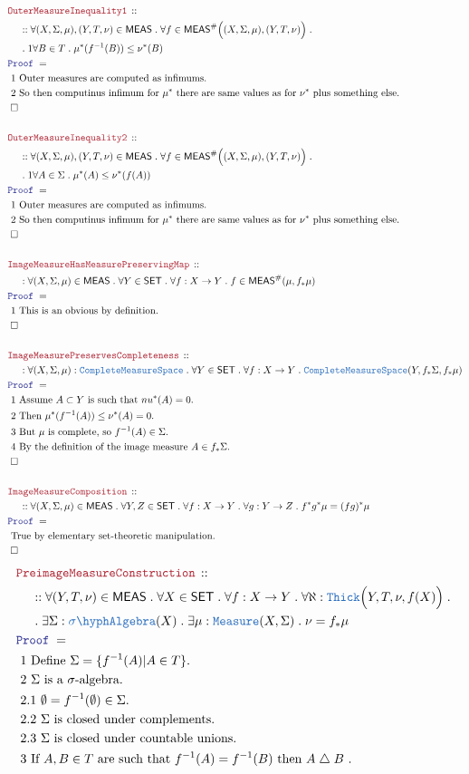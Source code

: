 \documentclass[12pt]{scrartcl}
\newcommand{\TYPE}[1]{\textcolor{NavyBlue}{\mathtt{#1}}}
\newcommand{\LOGIC}[1]{\textcolor{Blue}{\mathtt{#1}}}
\newcommand{\THM}[1]{\textcolor{Maroon}{\mathtt{#1}}}
\renewcommand{\.}{\; . \;}
\newcommand{\Theorem}[2]{& \THM{#1} \, :: \, #2 \\ & \Proof = \\ }
\newcommand{\NewLine}{\\ & \kern 1pc}
\newcommand{\Page}[1]{ \begin{align*} #1 \end{align*}   }
\newcommand{\du}{\; \triangle \;}
\newcommand{\QED}{\; \square}
\newcommand{\EndProof}{& \QED \\}
\newcommand{\Proof}{\LOGIC{Proof} \; }
\newcommand{\Explain}[1]{& \text{#1.} \\}
\newcommand{\SA}{\TYPE{\sigma \hyph Algebra}}
\newcommand{\SET}{\mathsf{SET}}
\newcommand{\Measure}{\TYPE{Measure}}
\newcommand{\CMS}{\TYPE{CompleteMeasureSpace}}
\newcommand{\MEAS}{\mathsf{MEAS}}
\begin{document}
{}\Page{
	\Theorem{OuterMeasureInequality1}
	{
		\NewLine ::		
		\forall (X,\Sigma,\mu),(Y,T,\nu) \in \MEAS \. 
		\forall f \in \MEAS^\#\Big((X,\Sigma,\mu),(Y,T,\nu)\Big) \. \NewLine \.1
		\forall B \in T \. 
		\mu^*(f^{-1}(B)) \le \nu^*(B) 
	}
	\Explain{ 1 Outer measures are computed as infimums}
	\Explain{ 2 So then computinus infimum for $\mu^*$ there are same
		values as for $\nu^*$ plus something else}
	\EndProof
	\\
	\Theorem{OuterMeasureInequality2}
	{
		\NewLine ::		
		\forall (X,\Sigma,\mu),(Y,T,\nu) \in \MEAS \. 
		\forall f \in \MEAS^\#\Big((X,\Sigma,\mu),(Y,T,\nu)\Big) \. \NewLine \.1
		\forall A \in \Sigma \. 
		\mu^*(A) \le \nu^*(f(A)) 
	}
	\Explain{ 1 Outer measures are computed as infimums}
	\Explain{ 2 So then computinus infimum for $\mu^*$ there are same
		values as for $\nu^*$ plus something else}
	\EndProof
	\\
	\Theorem{ImageMeasureHasMeasurePreservingMap}
	{
		\NewLine : 
		\forall (X,\Sigma,\mu) \in \MEAS \.
		\forall Y \in \SET \.
		\forall f : X \to Y \.
		f \in \MEAS^\#(\mu, f_* \mu)
	}
	\Explain{ 1 This is an obvious by definition}
	\EndProof
	\\
	\Theorem{ImageMeasurePreservesCompleteness}
	{
		\NewLine :
		\forall (X,\Sigma,\mu)  : \CMS \.
		\forall Y \in \SET \.
		\forall f : X \to Y \.
		\CMS(Y, f_*\Sigma, f_* \mu ) 
	}
	\Explain{ 1 Assume $A \subset Y$ is such that $nu^*(A) = 0$}
	\Explain{ 2 Then $\mu^*(f^{-1}(A)) \le \nu^*(A)  = 0$}
	\Explain{ 3 But $\mu$ is complete, so $f^{-1}(A) \in \Sigma$}
	\Explain{ 4 By the definition of the image measure $A \in f_* \Sigma$}
	\EndProof
	\\
	\Theorem{ImageMeasureComposition}
	{
		\NewLine ::		
		\forall (X,\Sigma,\mu) \in \MEAS \.
		\forall Y,Z \in \SET \.
		\forall f : X \to Y \.
		\forall g : Y \to Z \.
		f^* g^* \mu = (fg)^* \mu 
	}
	\Explain{ True by elementary set-theoretic manipulation}
	\EndProof
}\Page{
	\Theorem{PreimageMeasureConstruction}
	{
		\NewLine  ::
		\forall (Y,T,\nu) \in \MEAS \.
		\forall X \in \SET \.
		\forall f  : X \to Y \.
		\forall \aleph :   \TYPE{Thick}\Big(Y,T,\nu, f(X)\Big) \. \NewLine \.   
		\exists \Sigma : \SA(X) \.
		\exists \mu : \Measure(X,\Sigma) \.
		\nu = f_* \mu 
	}
	\Explain{ 1 Define $\Sigma = \{ f^{-1}(A) | A \in T  \}$} 
	\Explain{ 2 $\Sigma$ is a $\sigma$-algebra}
	\Explain{ 2.1  $\emptyset = f^{-1}(\emptyset) \in \Sigma$}
	\Explain{ 2.2 $\Sigma$ is closed under complements}
	\Explain{ 2.3 $\Sigma$ is closed under countable unions}
	\Explain{ 3 If $A,B \in T$ are such that $f^{-1}(A) = f^{-1}(B)$ then $A \du B$ 
}}
\end{document}
